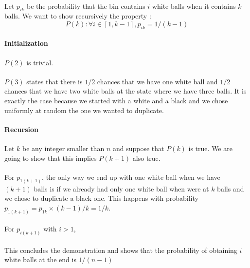 \paragraph{}
Let $p_{ik}$ be the probability that the bin contains $i$ white balls when it contains $k$ balls. We want to show recursively the property : 
\[ P(k) : \forall i \in [1,k-1], p_{ik} = 1/(k-1) \]


\paragraph{Initialization} 
\paragraph{}
$P(2)$ is trivial.
\paragraph{}
$P(3)$ states that there is $1/2$ chances that we have one white ball and $1/2$ chances that we have two white balls at the state where we have three balls. It is exactly the case because we started with a white and a black and we chose uniformly at random the one we wanted to duplicate.


\paragraph{Recursion}
\paragraph{}
Let $k$ be any integer smaller than $n$ and suppose that $P(k)$ is true. We are going to show that this implies $P(k+1)$ also true.
\paragraph{}
For $p_{1(k+1)}$, the only way we end up with one white ball when we have $(k+1)$ balls is if we already had only one white ball when were at $k$ balls and we chose to duplicate a black one. This happens with probability $p_{1(k+1)} = p_{1k} \times (k-1) / k = 1/k$.
\paragraph{}
For $p_{i(k+1)}$ with $i>1$,  





\paragraph{}This concludes the demonstration and shows that the probability of obtaining $i$ white balls at the end is $1/(n-1)$


